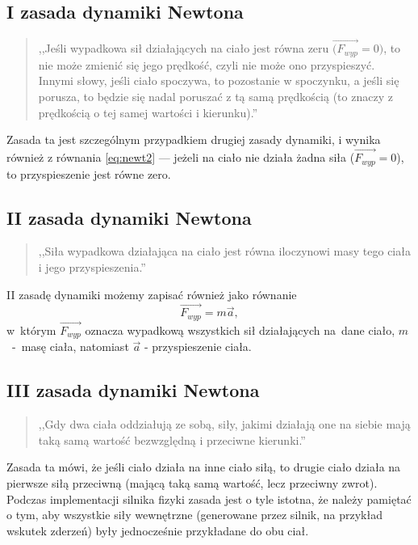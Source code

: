 \subsection{I zasada dynamiki Newtona}
\begin{quote}
	,,Jeśli wypadkowa sił działających na ciało jest równa zeru $\vec{(F_{wyp}} = 0)$, to nie może zmienić się jego prędkość, czyli nie może ono przyspieszyć.\newline
	Innymi słowy, jeśli ciało spoczywa, to pozostanie w spoczynku, a jeśli się porusza, to będzie się nadal poruszać z tą samą prędkością (to znaczy z prędkością o tej samej wartości i kierunku).''\newline
	\cite[Strona 88, rozdział 5.2]{bib:resnick1}
\end{quote}

Zasada ta jest szczególnym przypadkiem drugiej zasady dynamiki, i wynika również z równania \ref{eq:newt2} --- jeżeli na ciało nie działa żadna siła ($\vec{F_{wyp}} = 0$), to przyspieszenie jest równe zero. 

\subsection{II zasada dynamiki Newtona}
\label{part:drugazasadanewtona}
\begin{quote}
	,,Siła wypadkowa działająca na ciało jest równa iloczynowi masy tego ciała i jego przyspieszenia.'' \newline
	\cite[Strona 91, rozdział 5.5]{bib:resnick1} 
\end{quote}
II zasadę dynamiki możemy zapisać również jako równanie 
\begin{equation}
\vec{F_{wyp}}=m\vec{a}
\label{eq:newt2},
\end{equation}
w~którym $\vec{F_{wyp}}$ oznacza wypadkową wszystkich sił działających na~dane ciało, $m$~-~masę ciała, natomiast $\vec{a}$ - przyspieszenie ciała.

\subsection{III zasada dynamiki Newtona}
\begin{quote}
	,,Gdy dwa ciała oddziałują ze sobą, siły, jakimi działają one na siebie mają taką samą wartość bezwzględną i przeciwne kierunki.'' \newline
	\cite[strona 100, rozdział 5.7]{bib:resnick1}
\end{quote} 
Zasada ta mówi, że jeśli ciało działa na inne ciało siłą, to drugie ciało działa na pierwsze siłą przeciwną (mającą taką samą wartość, lecz przeciwny zwrot). Podczas implementacji silnika fizyki zasada jest o tyle istotna, że należy pamiętać o tym, aby wszystkie siły wewnętrzne (generowane przez silnik, na przykład wskutek zderzeń) były jednocześnie przykładane do obu ciał.

